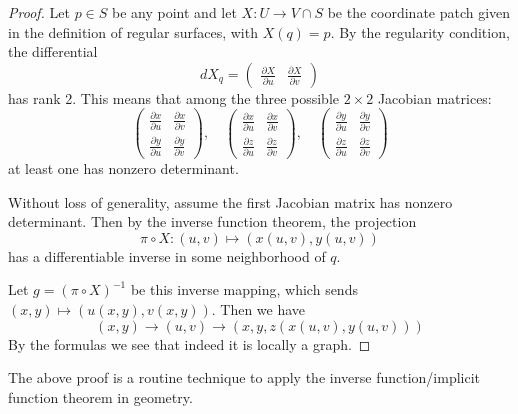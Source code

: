 \documentclass{article}
\begin{document}
\begin{proof}
Let $p \in S$ be any point and let $X: U \rightarrow V \cap S$ be the coordinate patch given in the definition of regular surfaces, with $X(q) = p$. By the regularity condition, the differential
\[
dX_q = \begin{pmatrix}
\frac{\partial X}{\partial u} & \frac{\partial X}{\partial v}
\end{pmatrix}
\]
has rank 2. This means that among the three possible $2 \times 2$ Jacobian matrices:
\[
\begin{pmatrix}
\frac{\partial x}{\partial u} & \frac{\partial x}{\partial v} \\
\frac{\partial y}{\partial u} & \frac{\partial y}{\partial v}
\end{pmatrix}, \quad
\begin{pmatrix}
\frac{\partial x}{\partial u} & \frac{\partial x}{\partial v} \\
\frac{\partial z}{\partial u} & \frac{\partial z}{\partial v}
\end{pmatrix}, \quad
\begin{pmatrix}
\frac{\partial y}{\partial u} & \frac{\partial y}{\partial v} \\
\frac{\partial z}{\partial u} & \frac{\partial z}{\partial v}
\end{pmatrix}
\]
at least one has nonzero determinant.

Without loss of generality, assume the first Jacobian matrix has nonzero determinant. Then by the inverse function theorem, the projection
\[
\pi \circ X: (u,v) \mapsto (x(u,v), y(u,v))
\]
has a differentiable inverse in some neighborhood of $q$.

Let $g = (\pi \circ X)^{-1}$ be this inverse mapping, which sends $(x,y) \mapsto (u(x,y), v(x,y))$. Then we have
\[(x,y)\to (u,v)\to (x,y,z(x(u,v),y(u,v)))\]
By the formulas we see that indeed it is locally a graph.
\end{proof}
\begin{remark}
    The above proof is a routine technique to apply the inverse function/implicit function theorem in geometry.
\end{remark}
\end{document}
